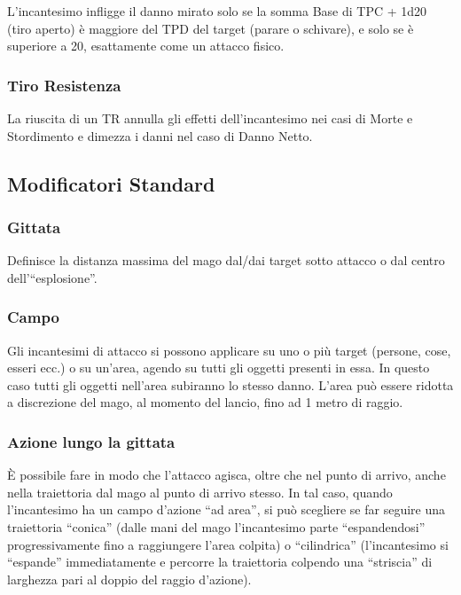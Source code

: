 L'incantesimo infligge il danno mirato solo se la somma Base di TPC +
1d20 (tiro aperto) \`e maggiore del TPD del target (parare o
schivare), e solo se \`e superiore a 20, esattamente come un attacco
fisico.


\subsubsection{Tiro Resistenza} 

La riuscita di un TR annulla gli effetti dell'incantesimo nei casi
di Morte e Stordimento e dimezza i danni nel caso di Danno Netto.

\subsection{Modificatori Standard}

\subsubsection{Gittata} 

Definisce la distanza massima del mago dal/dai target sotto attacco o dal
centro dell'``esplosione''. 

\subsubsection{Campo} 

Gli incantesimi di attacco si possono applicare su uno o pi\`u target
(persone, cose, esseri ecc.)  o su un'area, agendo su tutti gli
oggetti presenti in essa. In questo caso tutti gli oggetti nell'area
subiranno lo stesso danno. L'area pu\`o essere ridotta a discrezione
del mago, al momento del lancio, fino ad 1 metro di raggio.

\iffullversion
\subsubsection{Azione lungo la gittata} 

\`E possibile fare in modo che l'attacco agisca, oltre che nel punto
di arrivo, anche nella traiettoria dal mago al punto di arrivo stesso.
In tal caso, quando l'incantesimo ha un campo d'azione ``ad area'', si
pu\`o scegliere se far seguire una traiettoria ``conica'' (dalle
mani del mago l'incantesimo parte ``espandendosi'' progressivamente
fino a raggiungere l'area colpita) o ``cilindrica'' (l'incantesimo si
``espande'' immediatamente e percorre la traiettoria colpendo una
``striscia'' di larghezza pari al doppio del raggio d'azione).

